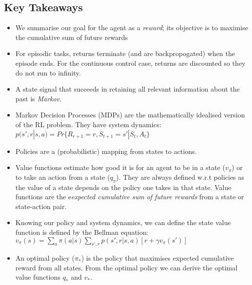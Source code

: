 \subsection{Key Takeaways}
\begin{itemize}
\item We summarise our goal for the agent as a \textit{reward}; its objective is to maximise the cumulative sum of future rewards
\item For episodic tasks, returns terminate (and are backpropogated) when the episode ends. For the continuous control case, returns are discounted so they do not run to infinity. 
\item A state signal that succeeds in retaining all relevant information about the past is \textit{Markov}. 
\item Markov Decision Processes (MDPs) are the mathematically idealised version of the RL problem. They have system dynamics: $p(s', r | s, a) = Pr \{R_{r+1} = r, S_{t+1} = s' | S_t, A_t\}$
\item Policies are a (probabilistic) mapping from states to actions.
\item Value functions estimate how good it is for an agent to be in a state ($v_\pi$) or to take an action from a state ($q_\pi$). They are always defined w.r.t policies as the value of a state depends on the policy one takes in that state. Value functions are the e\textit{expected cumulative sum of future rewards} from a state or state-action pair.
\item Knowing our policy and system dynamics, we can define the state value function is defined by the Bellman equation: $v_\pi(s) = \sum_{a} \pi(a|s) \sum_{s',r} p(s', r | s, a) \left[r + \gamma v_\pi(s')\right]$
\item An optimal policy ($\pi_*$) is the policy that maximises expected cumulative reward from all states. From the optimal policy we can derive the optimal value functions $q_*$ and $v_*$.
\end{itemize}










